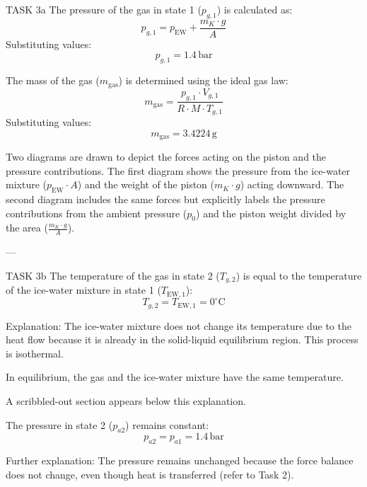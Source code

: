TASK 3a  
The pressure of the gas in state 1 (\( p_{g,1} \)) is calculated as:  
\[
p_{g,1} = p_{\text{EW}} + \frac{m_K \cdot g}{A}
\]  
Substituting values:  
\[
p_{g,1} = 1.4 \, \text{bar}
\]  

The mass of the gas (\( m_{\text{gas}} \)) is determined using the ideal gas law:  
\[
m_{\text{gas}} = \frac{p_{g,1} \cdot V_{g,1}}{R \cdot M \cdot T_{g,1}}
\]  
Substituting values:  
\[
m_{\text{gas}} = 3.4224 \, \text{g}
\]  

Two diagrams are drawn to depict the forces acting on the piston and the pressure contributions. The first diagram shows the pressure from the ice-water mixture (\( p_{\text{EW}} \cdot A \)) and the weight of the piston (\( m_K \cdot g \)) acting downward. The second diagram includes the same forces but explicitly labels the pressure contributions from the ambient pressure (\( p_0 \)) and the piston weight divided by the area (\( \frac{m_K \cdot g}{A} \)).  

---

TASK 3b  
The temperature of the gas in state 2 (\( T_{g,2} \)) is equal to the temperature of the ice-water mixture in state 1 (\( T_{\text{EW},1} \)):  
\[
T_{g,2} = T_{\text{EW},1} = 0^\circ \text{C}
\]  

Explanation:  
The ice-water mixture does not change its temperature due to the heat flow because it is already in the solid-liquid equilibrium region. This process is isothermal.  

In equilibrium, the gas and the ice-water mixture have the same temperature.  

A scribbled-out section appears below this explanation.  

The pressure in state 2 (\( p_{a2} \)) remains constant:  
\[
p_{a2} = p_{a1} = 1.4 \, \text{bar}
\]  

Further explanation:  
The pressure remains unchanged because the force balance does not change, even though heat is transferred (refer to Task 2).